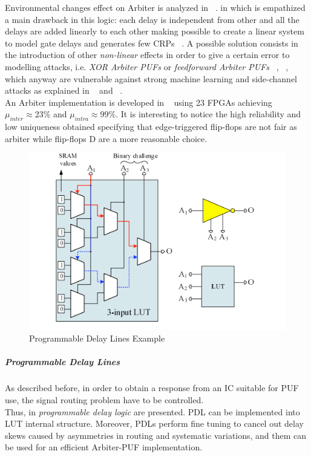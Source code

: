 \documentclass[../tesi.tex]{subfiles}
\begin{document}
Environmental changes effect on Arbiter \puf{} is analyzed in ~\cite{delvaux2013fault}. 
in which is empathized a main drawback in this logic: each delay is independent from other and all the delays are added linearly to each other making possible to create a linear system to model gate delays and generates few CRPs  ~\cite{lim2005extracting}.  
A possible solution consists in the introduction of other \emph{non-linear} effects in order to give a certain error to modelling attacks, i.e. \emph{XOR Arbiter PUFs} or \emph{feedforward Arbiter PUFs}  ~\cite{majzoobi2008lightweight}, ~\cite{suh2007physical}, which anyway are vulnerable against strong machine learning and side-channel attacks as explained in ~\cite{ruhrmair2013power} and ~\cite{mahmoud2013combined}.\\
An Arbiter \puf{} implementation is developed in ~\cite{gassend2004identification} using 23 FPGAs achieving $\mu_{inter} \approx 23\%$ and $\mu_{intra} \approx 99\%$. It is interesting to notice the high reliability and low uniqueness obtained specifying that edge-triggered flip-flops are not fair as arbiter while flip-flops D are a more reasonable choice.
\begin{figure}
\centering
\includegraphics[scale=0.40]{images/pdl1.png}
\caption{Programmable Delay Lines Example}
\label{fig:pdl1}
\end{figure}
\subparagraph{Programmable Delay Lines} \label{par:programmabledelay}
As described before, in order to obtain a response from an IC suitable for PUF use, the signal routing problem have to be controlled. \\
Thus, in \cite{majzoobi2010fpga} \emph{programmable delay logic} are presented. PDL can be implemented into LUT internal structure. Moreover, PDLs perform fine tuning to cancel out delay skews caused by asymmetries in routing and systematic variations, and them can be used for an efficient Arbiter-PUF implementation.
\end{document}
